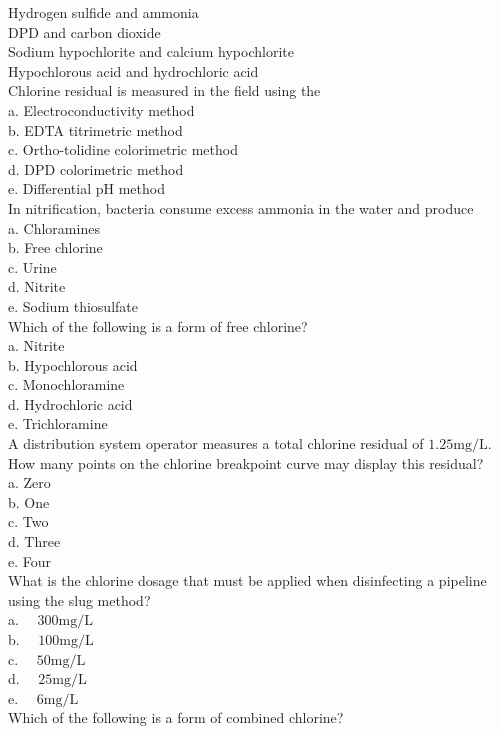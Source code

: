Hydrogen sulfide and ammonia\\
DPD and carbon dioxide\\
Sodium hypochlorite and calcium hypochlorite\\
Hypochlorous acid and hydrochloric acid\\
  Chlorine residual is measured in the field using the\\
a. Electroconductivity method\\
b. EDTA titrimetric method\\
c. Ortho-tolidine colorimetric method\\
d. DPD colorimetric method\\
e. Differential $\mathrm{pH}$ method\\
In nitrification, bacteria consume excess ammonia in the water and produce\\
a. Chloramines\\
b. Free chlorine\\
c. Urine\\
d. Nitrite\\
e. Sodium thiosulfate\\
  Which of the following is a form of free chlorine?\\
a. Nitrite\\
b. Hypochlorous acid\\
c. Monochloramine\\
d. Hydrochloric acid\\
e. Trichloramine\\
  A distribution system operator measures a total chlorine residual of $1.25 \mathrm{mg} / \mathrm{L}$. How many points on the chlorine breakpoint curve may display this residual?\\
a. Zero\\
b. One\\
c. Two\\
d. Three\\
e. Four\\
  What is the chlorine dosage that must be applied when disinfecting a pipeline using the slug method?\\
a. $\quad 300 \mathrm{mg} / \mathrm{L}$\\
b. $\quad 100 \mathrm{mg} / \mathrm{L}$\\
c. $\quad 50 \mathrm{mg} / \mathrm{L}$\\
d. $\quad 25 \mathrm{mg} / \mathrm{L}$\\
e. $\quad 6 \mathrm{mg} / \mathrm{L}$ \\
Which of the following is a form of combined chlorine?\\
